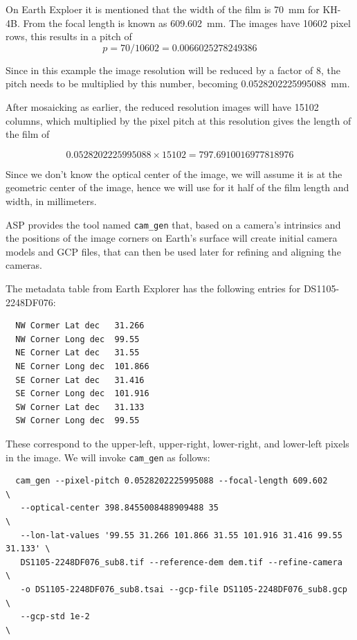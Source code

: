 On Earth Exploer it is mentioned that the width 
of the film is 70~mm for KH-4B. From \cite{sohn2004mathematical} the focal length
is known as 609.602~mm. The images have 10602 pixel rows, this results
in a pitch of
\begin{equation*}
  p = 70/10602 = 0.0066025278249386
\end{equation*}

Since in this example the image resolution will be reduced by a factor of 8,
the pitch needs to be multiplied by this number, becoming 0.0528202225995088~mm.

After mosaicking as earlier, the reduced resolution images will have
15102 columns, which multiplied by the pixel pitch at this resolution gives
the length of the film of 

\begin{equation*}
 0.0528202225995088 \times 15102 = 797.6910016977818976
\end{equation*}

Since we don't know the optical center of the image, we will assume it is at
the geometric center of the image, hence we will use for it half of
the film length and width, in millimeters. 

ASP provides the tool named \texttt{cam\_gen} that, based on a camera's intrinsics
and the positions of the image corners on Earth's surface will
create initial camera models and GCP files, that can then be used later
for refining and aligning the cameras.

The metadata table from Earth Explorer has the following entries
for DS1105-2248DF076:
\begin{verbatim}
  NW Cormer Lat dec   31.266
  NW Corner Long dec  99.55
  NE Corner Lat dec   31.55
  NE Corner Long dec  101.866
  SE Corner Lat dec   31.416
  SE Corner Long dec  101.916
  SW Corner Lat dec   31.133
  SW Corner Long dec  99.55
\end{verbatim}

These correspond to the upper-left, upper-right, lower-right, and lower-left
pixels in the image. We will invoke \texttt{cam\_gen} as follows:

\begin{verbatim}
  cam_gen --pixel-pitch 0.0528202225995088 --focal-length 609.602            \
   --optical-center 398.8455008488909488 35                                  \
   --lon-lat-values '99.55 31.266 101.866 31.55 101.916 31.416 99.55 31.133' \
   DS1105-2248DF076_sub8.tif --reference-dem dem.tif --refine-camera         \
   -o DS1105-2248DF076_sub8.tsai --gcp-file DS1105-2248DF076_sub8.gcp        \
   --gcp-std 1e-2                                                            \
\end{verbatim}

